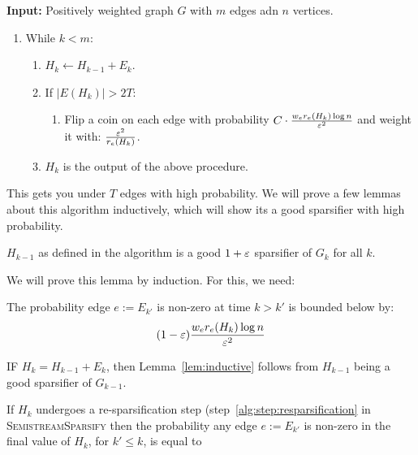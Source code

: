 \documentclass[12pt]{article}
\begin{document}
\begin{algorithm}
  \caption{$\textsc{SemistreamSparsify}(G, \eps)$}
\textbf{Input:} Positively weighted graph $G$ with $m$ edges adn $n$ vertices.

\begin{enumerate}
\item While $k < m$:
\begin{enumerate}
  \item $H_k \leftarrow H_{k-1} + E_k$.
  \item If $|E(H_k)| > 2T$:
    \begin{enumerate}
    \item Flip a coin on each edge with probability 
    $C \cdot \frac{w_e r_e(H_k) \log n}{\varepsilon^2}$ 
    and weight it with: $\frac{\varepsilon^2}{r_e(H_k)}$.
    \label{alg:step:resparsification}
    \end{enumerate}
  \item $H_k$ is the output of the above procedure.
\end{enumerate}
\end{enumerate}
\label{alg:semi-stream}
\end{algorithm}

This gets you under $T$ edges with high probability. We will prove a few
lemmas about this algorithm inductively, which will show its a good
sparsifier with high probability.

\begin{lemma}
\label{lem:inductive}
$H_{k-1}$ as defined in the algorithm is a good $1+\varepsilon$ sparsifier of
$G_k$ for all $k$.
\end{lemma}
We will prove this lemma by induction. For this, we need:


\begin{lemma}
\label{lem:ER}
The probability edge $e:=E_{k'}$ is non-zero at time $k > k'$ is bounded
below
by:
\begin{align}
(1-\varepsilon) \frac{w_e r_e(H_k) \log n}{\varepsilon^2}
\end{align}
\end{lemma}

IF $H_k = H_{k-1} + E_k$, then Lemma~\ref{lem:inductive} follows from
$H_{k-1}$ being a good sparsifier of $G_{k-1}$.

If $H_k$ undergoes a re-sparsification step
(step~\ref{alg:step:resparsification} in \textsc{SemistreamSparsify}
 then the probability any edge $e:=E_{k'}$ is non-zero in the final value
 of $H_k$, for $k' \leq k$, is
 equal to
\end{document}
